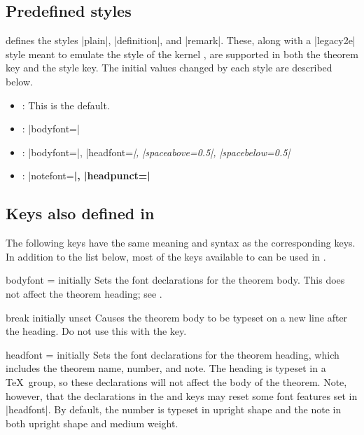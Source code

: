 \documentclass{ltxdoc}
\begin{document}
\subsection{Predefined styles}
\label{predefsty}

 defines the styles |plain|, |definition|, and |remark|.
These, along with a |legacy2e| style meant to emulate the style of the kernel , are supported in both the  theorem key and the  style key.
The initial values changed by each style are described below.
\begin{itemize}
  \item {}: This is the default.
  \item {}: |bodyfont=\normalfont|
  \item {}: |bodyfont=\normalfont|, |headfont=\itshape|, |spaceabove=0.5\topsep|, |spacebelow=0.5\topsep|
  \item {}: |notefont=\bfseries|, |headpunct={}|
\end{itemize}

\subsection{Keys also defined in }
\label{stylekeys:thmtools}

The following keys have the same meaning and syntax as the corresponding  keys.
In addition to the list below, most of the keys available to  can be used in .

\begin{docKey}{bodyfont}
  {=}
  {initially }
Sets the font declarations for the theorem body.
This does not affect the theorem heading; see .
\end{docKey}

\begin{docKey}{break}
  {}
  {initially unset}
Causes the theorem body to be typeset on a new line after the heading.
Do not use this with the  key.
\end{docKey}

\begin{docKey}{headfont}
  {=}
  {initially }
Sets the font declarations for the theorem heading, which includes the theorem name, number, and note.
The heading is typeset in a \TeX\ group, so these declarations will not affect the body of the theorem.
Note, however, that the declarations in the  and  keys may reset some font features set in |headfont|.
By default, the number is typeset in upright shape and the note in both upright shape and medium weight.
\end{docKey}
\end{document}
